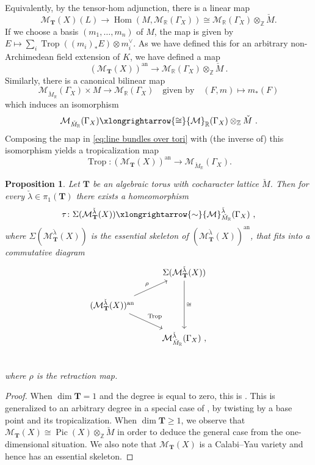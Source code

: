 \documentclass[10pt, a4paper]{amsart}
\newtheorem{proposition}[theorem]{Proposition}
\theoremstyle{definition}
\theoremstyle{myitemstyle}
\newcommand{\R}{\mathbb{R}}
\newcommand{\Z}{\mathbb{Z}}
\newcommand{\Mcheck}{{\check{M}}}
\newcommand{\lambdacheck}{\check{\lambda}}
\newcommand{\bfT}{\mathbf{T}}
\newcommand{\mc}[1]{{\mathcal{#1}}}
\DeclareMathOperator{\Pic}{Pic}
\DeclareMathOperator{\Hom}{Hom}
\DeclareMathOperator{\Trop}{Trop}
\newcommand{\an}{\mathrm{an}}
\newcommand{\Ga}{\Gamma}
\begin{document}
Equivalently, by the tensor-hom adjunction, there is a linear map
\[
\mc M_\bfT(X)(L)\longrightarrow  \Hom(M,\mc M_\R(\Ga_X)) \cong \mc M_\R(\Ga_X)\otimes_\Z  \Mcheck.
\]
If we choose a basis $(m_1,\dots,m_n)$ of $M$, the map is given by $E \mapsto \sum_i \Trop((m_{i})_*E) \otimes m_i^\vee$.
As we have defined this for an arbitrary non-Archimedean field extension of $K$, we have defined a map
\begin{equation}
\label{eq:line bundles over tori}
(\mc M_\bfT(X))^\an\longrightarrow \mc M_\R(\Ga_X)\otimes_\Z \Mcheck \ .
\end{equation}
Similarly, there is a canonical bilinear map
\[
 \mc M_{\Mcheck_\R}(\Ga_X) \times M\longrightarrow \mc M_\R(\Ga_X) \quad\text{given by}\quad (F,m) \longmapsto m_*(F)
\]
which induces an isomorphism 
\[
\mc M_{\Mcheck_\R}(\Ga_X)\xlongrightarrow{\cong} \mc M_\R(\Ga_X)\otimes_\Z \Mcheck \ .
\]
Composing the map in \eqref{eq:line bundles over tori} with (the inverse of) this isomorphism yields a tropicalization map
\[
\Trop \colon (\mc M_\bfT(X))^\an\longrightarrow \mc M_{\Mcheck_\R}(\Ga_X).
\]


\begin{proposition}
\label{prop:tropicalization is retraction for torus bundles}
Let $\mathbf{T}$ be an algebraic torus with cocharacter lattice $\Mcheck$. Then for every $\lambdacheck \in \pi_1(\bfT)$ there exists a homeomorphism 
\[
    \tau \colon \Sigma(\mc M^{\lambdacheck}_{\bfT}(X)) \xlongrightarrow{\sim} \mc M_{\Mcheck_\R}^{\lambdacheck}(\Gamma_X) \ ,  
\]
where $\Sigma(\mc M^{\lambdacheck}_{\bfT}(X))$ is the essential skeleton of $(\mathcal{M}_\bfT^{\lambdacheck}(X))^{\an}$, that fits into a commutative diagram
\[
\begin{tikzcd}
    & 
        \Sigma(\mc M^{\lambdacheck}_{\bfT}(X))\arrow[dd,"\cong"] \\
    (\mathcal{M}_\bfT^{\lambdacheck}(X))^{\an} \arrow[ur,"\rho"]\arrow[dr,"\Trop"]&
        & \\
    &
        \mc M_{\Mcheck_\R}^{\lambdacheck}(\Gamma_X)    \ ,\\
\end{tikzcd}
\]
where $\rho$ is the retraction map.
\end{proposition}

\begin{proof} 
When $\dim \bfT=1$ and the degree is equal to zero, this is \cite[Theorem 1.3]{BakerRabinoff}. This is generalized to an arbitrary degree in a special case of \cite[Theorem 6.2]{2022GrossUlirschZakharov}, by twisting by a base point and its tropicalization.  When $\dim \bfT\geq 1$, we observe that $\mc M_\bfT(X) \cong \Pic(X) \otimes_\Z \Mcheck$ in order to deduce the general case from the one-dimensional situation. We also note that $\mc M_\bfT(X)$ is a Calabi--Yau variety and hence has an essential skeleton. 
\end{proof}
\end{document}
